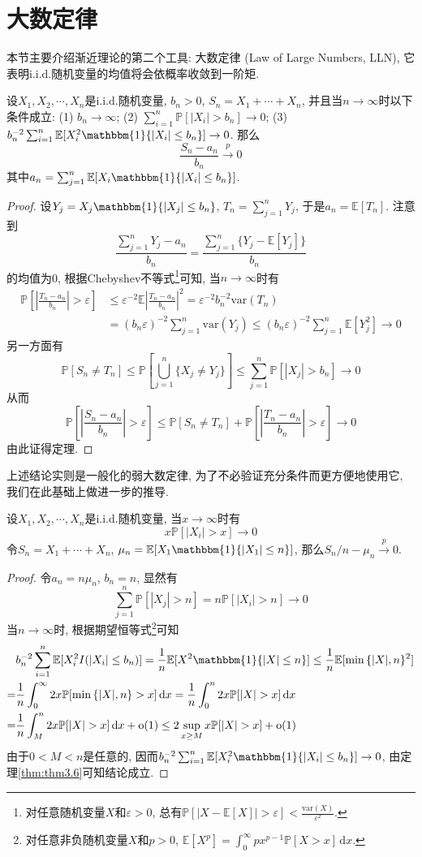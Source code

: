 \documentclass[cn, 12pt, math=mtpro2, bibstyle=apa, blue, twocol]{elegantbook}
\newcommand{\E}{\mathbb{E}}
\newcommand{\PP}{\mathbb{P}}
\newcommand{\var}{\text{var}}
\begin{document}
\section{大数定律}
本节主要介绍渐近理论的第二个工具: 大数定律 (Law of Large Numbers, LLN), 它表明i.i.d.随机变量的均值将会依概率收敛到一阶矩.
\begin{theorem}\label{thm:thm3.6}
  设$X_1, X_2,\cdots, X_n$是i.i.d.随机变量, $b_n>0$, $S_n=X_1+\cdots+X_n$, 并且当$n\to\infty$时以下条件成立: (1) $b_n\to\infty$; (2) $\sum_{i=1}^{n}\PP[|X_i|>b_n]\to0$; (3) $b_n^{-2}\sum_{i=1}^{n}\E[X_i^2\mathbbm{1}\{|X_i|\leq b_n\}]\to0$. 那么
  $$\frac{S_n-a_n}{b_n}\xrightarrow{p}0$$
  其中$a_n=\sum_{j=1}^{n}\E[X_i\mathbbm{1}\{|X_i|\leq b_n\}]$.
\end{theorem}
\begin{proof}
  设$Y_j=X_j\mathbbm{1}\{|X_j|\leq b_n\}$, $T_n=\sum_{j=1}^{n}Y_j$, 于是$a_n=\E[T_n]$. 注意到
  $$\frac{\sum_{j=1}^{n}Y_j-a_n}{b_n}=\frac{\sum_{j=1}^{n}\{Y_j-\E[Y_j]\}}{b_n}$$
  的均值为0, 根据Chebyshev不等式\footnote{对任意随机变量$X$和$\varepsilon>0$, 总有$\displaystyle\PP[|X-\E[X]|>\varepsilon]<\frac{\var(X)}{\varepsilon^2}$.}可知, 当$n\to\infty$时有
  \begin{align*}
  \PP\left[\left|\frac{T_n-a_n}{b_n}\right|>\varepsilon\right]&\leq\varepsilon^{-2}\E\left|\frac{T_n-a_n}{b_n}\right|^2=\varepsilon^{-2}b_n^{-2}\text{var}(T_n) \\
  &=(b_n\varepsilon)^{-2}\sum_{j=1}^{n}\text{var}(Y_j)\leq(b_n\varepsilon)^{-2}\sum_{j=1}^{n}\E[Y_j^2]\to0
  \end{align*}
  另一方面有
  $$\PP[S_n\neq T_n]\leq \PP\left[\bigcup_{j=1}^n\{X_j\neq Y_j\}\right]\leq\sum_{j=1}^{n}\PP[|X_j|>b_n]\to0$$
  从而
  $$\PP\left[\left|\frac{S_n-a_n}{b_n}\right|>\varepsilon\right]\leq \PP[S_n\neq T_n]+\PP\left[\left|\frac{T_n-a_n}{b_n}\right|>\varepsilon\right]\to0$$
  由此证得定理.
\end{proof}
上述结论实则是一般化的弱大数定律, 为了不必验证充分条件而更方便地使用它, 我们在此基础上做进一步的推导.
\begin{theorem}\label{thm:thm3.2}
  设$X_1, X_2,\cdots, X_n$是i.i.d.随机变量, 当$x\to\infty$时有
  $$x\PP[|X_i|>x]\to0$$
  令$S_n=X_1+\cdots+X_n$, $\mu_n=\E[X_1\mathbbm{1}\{|X_1|\leq n\}]$, 那么$S_n/n-\mu_n\xrightarrow{p}0$.
\end{theorem}
\begin{proof}
令$a_n=n\mu_n$, $b_n=n$, 显然有
  $$\sum_{j=1}^{n}\PP[|X_j|>n]=n\PP[|X_i|>n]\to0$$
  当$n\to\infty$时, 根据期望恒等式\footnote{对任意非负随机变量$X$和$p>0$, $\displaystyle\E[X^p]=\int_{0}^{\infty}px^{p-1}\PP[X>x]\,\text{d}x$.}可知
  \begin{align*}
  &b_n^{-2}\sum_{i=1}^n\E[X_i^2I(|X_i|\leq b_n)]=\frac{1}{n}\E[X^2\mathbbm{1}\{|X|\leq n\}]\leq\frac{1}{n}\E[\min\,\{|X|,n\}^2] \\
  =&\frac{1}{n}\int_{0}^{\infty}2x\PP[\min\,\{|X|,n\}>x]\,\text{d}x=\frac{1}{n}\int_{0}^{n}2x\PP[|X|>x]\,\text{d}x \\
  =&\frac{1}{n}\int_{M}^{n}2x\PP[|X|>x]\,\text{d}x+\text{o}(1)\leq 2\sup_{x\geq M}x\PP[|X|>x]+\text{o}(1)
  \end{align*}
  由于$0<M<n$是任意的, 因而$b_n^{-2}\sum_{i=1}^{n}\E[X_i^2\mathbbm{1}\{|X_i|\leq b_n\}]\to0$, 由定理\ref{thm:thm3.6}可知结论成立.
\end{proof}
\end{document}
